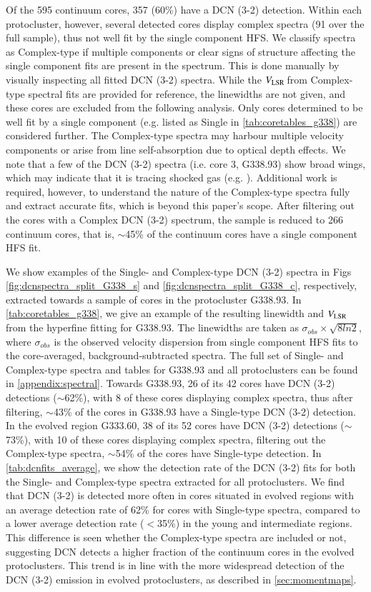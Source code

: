 \documentclass[longauth]{aa} %
\newcommand{\vlsr}{\mbox{$V_{\rm LSR}$\,}}
\begin{document}
Of the 595 continuum cores, 357 (60\%) have a DCN (3-2) detection. Within each protocluster, however, several detected cores display complex spectra (91 over the full sample), thus not well fit by the single component HFS. We classify spectra as Complex-type if multiple components or clear signs of structure affecting the single component fits are present in the spectrum. This is done manually by visually inspecting all fitted DCN (3-2) spectra. 
While the \vlsr from Complex-type spectral fits are provided for reference, the linewidths are not given, and these cores are excluded from the following analysis. Only cores determined to be well fit by a single component (e.g. listed as Single in \cref{tab:coretables_g338}) are considered further. The Complex-type spectra may harbour multiple velocity components or arise from line self-absorption due to optical depth effects. We note that a few of the DCN (3-2) spectra (i.e. core 3, G338.93) show broad wings, which may indicate that it is tracing shocked gas (e.g. \citealt{Busquet2017}). Additional work is required, however, to understand the nature of the Complex-type spectra fully and extract accurate fits, which is beyond this paper's scope. After filtering out the cores with a Complex DCN (3-2) spectrum, the sample is reduced to 266 continuum cores, that is, $\sim$45\% of the continuum cores have a single component HFS fit. 

We show examples of the Single- and Complex-type DCN (3-2) spectra in Figs \ref{fig:dcnspectra_split_G338_s} and \ref{fig:dcnspectra_split_G338_c}, respectively, extracted towards a sample of cores in the protocluster G338.93. In \cref{tab:coretables_g338}, we give an example of the resulting linewidth and \vlsr from the hyperfine fitting for G338.93. The linewidths are taken as $\sigma_{obs}\times\sqrt{8ln2}$, where $\sigma_{obs}$ is the observed velocity dispersion from single component HFS fits to the core-averaged, background-subtracted spectra. The full set of Single- and Complex-type spectra and tables for G338.93 and all protoclusters can be found in \cref{appendix:spectral}. Towards G338.93, 26 of its 42 cores have DCN (3-2) detections ($\sim$62\%), with 8 of these cores displaying complex spectra, thus after filtering, $\sim$43\% of the cores in G338.93 have a Single-type DCN (3-2) detection. In the evolved region G333.60, 38 of its 52 cores have DCN (3-2) detections ($\sim$73\%), with 10 of these cores displaying complex spectra, filtering out the Complex-type spectra, $\sim$54\% of the cores have Single-type detection. In \cref{tab:dcnfits_average}, we show the detection rate of the DCN (3-2) fits for both the Single- and Complex-type spectra extracted for all protoclusters. We find that DCN (3-2) is detected more often in cores situated in evolved regions with an average detection rate of 62\% for cores with Single-type spectra, compared to a lower average detection rate ($<$35\%) in the young and intermediate regions. This difference is seen whether the Complex-type spectra are included or not, suggesting DCN detects a higher fraction of the continuum cores in the evolved protoclusters. This trend is in line with the more widespread detection of the DCN (3-2) emission in evolved protoclusters, as described in \cref{sec:momentmaps}.
\end{document}
